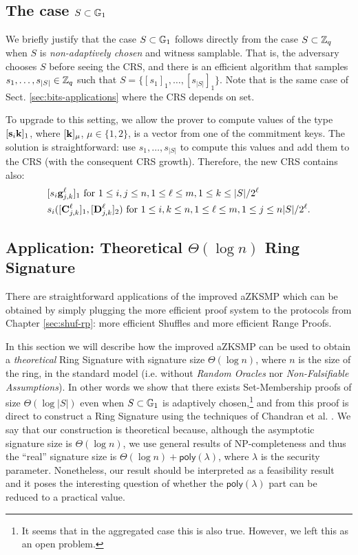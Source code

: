 \subsection{The case $S\subset\mathbb{G}_1$} \label{sec:improved-aZKSMP-group-case}
We briefly justify that the case $S\subset\mathbb{G}_1$ follows directly from the case $S\subset\mathbb{Z}_q$ when $S$ is \emph{non-adaptively chosen} and witness samplable. That is, the adversary chooses $S$ before seeing the CRS, and there is an efficient algorithm that samples $s_1,\ldots,s_{|S|}\in\mathbb{Z}_q$ such that $S=\{[s_1]_1,\ldots,[s_{|S|}]_1\}$. Note that is the same case of Sect. \ref{sec:bits-applications} where the CRS depends on set.

To upgrade to this setting, we allow the prover to compute values of the type $[\mathbf{s}_i\mathbf{k}]_1$, where $[\mathbf{k}]_\mu$, $\mu\in\{1,2\}$, is a vector from one of the commitment keys. The solution is straightforward: use $s_1,\ldots,s_{|S|}$ to compute this values and add them to the CRS (with the consequent CRS growth). Therefore, the new CRS contains also:
\begin{align*}
&[s_i\mathbf{g}_{j,k}^\ell]_1 \text{ for }1\leq i,j\leq n, 1\leq\ell\leq m, 1\leq k\leq |S|/2^\ell\\
& s_i([\mathbf{{C}}^\ell_{j,k}]_1,[\mathbf{{D}}_{j,k}^\ell]_2) \text{ for } 1\leq i,k\leq n, 1\leq\ell\leq m,1\leq j\leq n|S|/2^\ell.
\end{align*}

\subsection{Application: Theoretical $\Theta(\log n)$ Ring Signature} \label{sec:log-ring-signature}
There are straightforward applications of the improved aZKSMP which can be obtained by simply plugging the more efficient proof system to the protocols from Chapter \ref{sec:shuf-rp}: more efficient Shuffles and more efficient Range Proofs.

In this section we will describe how the improved aZKSMP can be used to obtain a \emph{theoretical} Ring Signature with signature size $\Theta(\log n)$, where $n$ is the size of the ring, in the standard model (i.e. without \emph{Random Oracles} nor \emph{Non-Falsifiable Assumptions}). In other words we show that there exists Set-Membership proofs of size $\Theta(\log |S|)$ even when $S\subset \mathbb{G}_1$ is adaptively chosen,\footnote{It seems that in the aggregated case this is also true. However, we left this as an open problem.} and from this proof is direct to construct a Ring Signature using the techniques of Chandran et al. \cite{ICALP:ChaGroSah07}. We say that our construction is theoretical because, although the asymptotic signature size is $\Theta(\log n)$, we use general results of NP-completeness and thus the ``real'' signature size is $\Theta(\log n)+\mathsf{poly}(\lambda)$, where $\lambda$ is the security parameter. Nonetheless, our result should be interpreted as a feasibility result and it poses the interesting question of whether the $\mathsf{poly}(\lambda)$ part can be reduced to a practical value.

